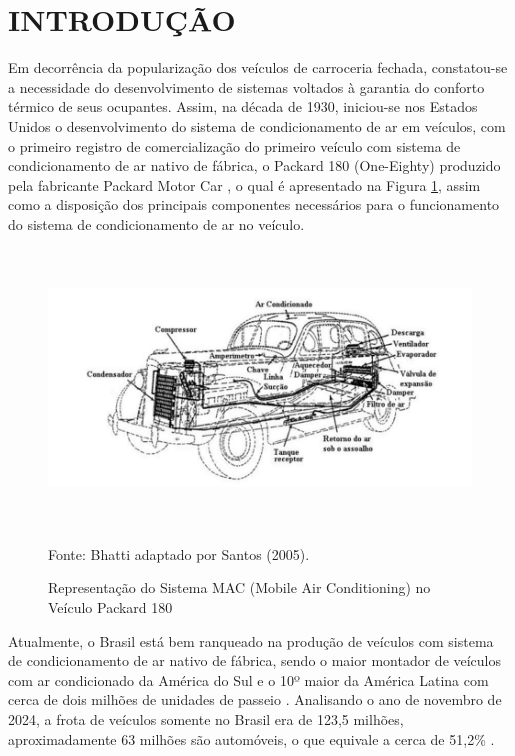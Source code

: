 \section{INTRODUÇÃO}

Em decorrência da popularização dos veículos de carroceria fechada, constatou-se a necessidade do desenvolvimento de sistemas voltados à garantia do conforto térmico de seus ocupantes. 
Assim, na década de 1930, iniciou-se nos Estados Unidos o desenvolvimento do sistema de condicionamento de ar em veículos, com o primeiro registro de comercialização do primeiro veículo com sistema de condicionamento de ar nativo de fábrica, o Packard 180 (One-Eighty) produzido pela fabricante Packard Motor Car \cite{bhatti1999}, o qual é apresentado na Figura \ref{fig:sistemaMAC}, assim como a disposição dos principais componentes necessários para o funcionamento do sistema de condicionamento de ar no veículo.
\\

\begin{figure}[h]
    \centering
    
    \caption{ Representação do Sistema MAC (Mobile Air Conditioning) no Veículo Packard 180}
    
    \includegraphics[width=15.65cm, height=7.35cm]{FigurasdoTexto/sistemaMAC.png}
    
     \vspace{5pt}  %
    {\footnotesize Fonte: Bhatti adaptado por Santos (2005).}  %
    \label{fig:sistemaMAC}
\end{figure}

Atualmente, o Brasil está bem ranqueado na produção de veículos com sistema de condicionamento de ar nativo de fábrica, sendo o maior montador de veículos com ar condicionado da América do Sul e o 10º maior da América Latina com cerca de dois milhões de unidades de passeio \cite{dasilva2024}. Analisando o ano de novembro de 2024, a frota de veículos somente no Brasil era de 123,5 milhões, aproximadamente 63 milhões são automóveis, o que equivale a cerca de 51,2\%  \cite{ministerio2024}.

